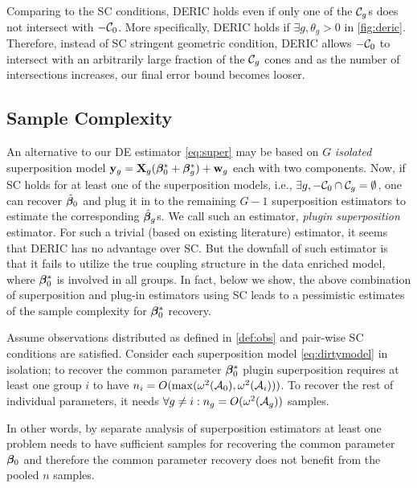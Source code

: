 

\begin{remark}
Comparing to the SC conditions, DERIC holds even if only one of the $\cC_g$s does not intersect with $-\cC_0$. More specifically, DERIC holds if $\exists g, \theta_g > 0$ in \cref{fig:deric}. Therefore, instead of SC stringent geometric condition, DERIC allows $-\cC_0$ to intersect with an arbitrarily large fraction of the $\cC_g$ cones and as the number of intersections increases, our final error bound becomes looser.
\end{remark}

\subsection{Sample Complexity}
An alternative to our DE estimator \cref{eq:super} may be based on $G$ \emph{isolated} superposition model $\mathbf{y}_g = \mathbf{X}_g (\boldsymbol{\beta} _0^* + \boldsymbol{\beta} _g^*) + \mathbf{w}_g$ each with two components. Now, if SC holds for at least one of the superposition models, i.e., $\exists g, -\cC_0 \cap \cC_g = \emptyset$, one can recover $\hat{\boldsymbol{\beta}}_0$ and plug it in to the remaining $G-1$ superposition estimators to estimate the corresponding $\hat{\boldsymbol{\beta}}_g$s. We call such an estimator, \emph{plugin superposition} estimator. For such a trivial (based on existing literature) estimator, it seems that DERIC has no advantage over SC. But the downfall of such estimator is that it fails to utilize the true coupling structure in the data enriched model, where $\boldsymbol{\beta}^*_0$ is involved in all groups. In fact, below we show, the above combination of superposition and plug-in estimators using SC leads to a pessimistic estimates of the sample complexity for $\boldsymbol{\beta}^*_0$ recovery.
\begin{prop}
	\label{prop:super}
	Assume observations distributed as defined in \cref{def:obs} and pair-wise SC conditions are satisfied.  Consider each superposition model \cref{eq:dirtymodel} in isolation; to recover the common parameter $\boldsymbol{\beta} _0^*$ plugin superposition requires at least one group $i$ to have $n_i = O(\max(\omega^2(\cA_0), \omega^2(\cA_i)))$. 
	To recover the rest of individual parameters, it needs $\forall g \neq i: n_g = O(\omega^2(\cA_g))$ samples. 
\end{prop}
In other words, by separate analysis of superposition estimators at least one problem needs to have sufficient samples for recovering the common parameter $\boldsymbol{\beta}_0$ and therefore the common parameter recovery does not benefit from the pooled $n$ samples.

